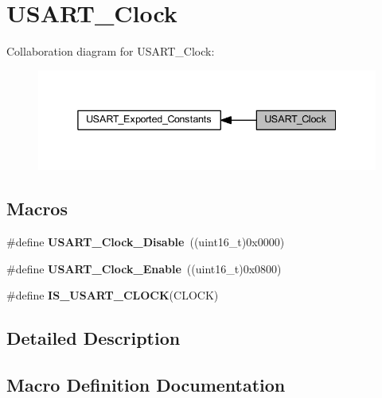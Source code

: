 \hypertarget{group___u_s_a_r_t___clock}{}\section{U\+S\+A\+R\+T\+\_\+\+Clock}
\label{group___u_s_a_r_t___clock}
Collaboration diagram for U\+S\+A\+R\+T\+\_\+\+Clock\+:\nopagebreak
\begin{figure}[H]
\begin{center}
\leavevmode
\includegraphics[width=338pt]{group___u_s_a_r_t___clock}
\end{center}
\end{figure}
\subsection*{Macros}
\begin{DoxyCompactItemize}
\item 
\mbox{\label{group___u_s_a_r_t___clock_ga56c12b81d19853c093e0a373d0c52fb5}} 
\#define {\bfseries U\+S\+A\+R\+T\+\_\+\+Clock\+\_\+\+Disable}~((uint16\+\_\+t)0x0000)
\item 
\mbox{\label{group___u_s_a_r_t___clock_gacfe029e2ec4f49ddde031fd031654caa}} 
\#define {\bfseries U\+S\+A\+R\+T\+\_\+\+Clock\+\_\+\+Enable}~((uint16\+\_\+t)0x0800)
\item 
\#define {\bfseries I\+S\+\_\+\+U\+S\+A\+R\+T\+\_\+\+C\+L\+O\+CK}(C\+L\+O\+CK)
\end{DoxyCompactItemize}


\subsection{Detailed Description}


\subsection{Macro Definition Documentation}
\mbox{\label{group___u_s_a_r_t___clock_ga0f1e1ba37690b21b7338ed3b06614cf6}} 
